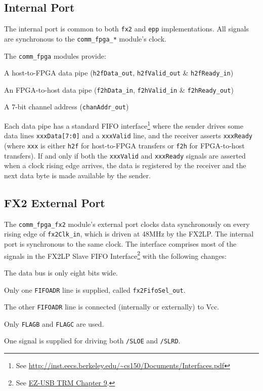 \subsection{Internal Port}
The internal port is common to both \texttt{fx2} and \texttt{epp} implementations. All signals are synchronous to the \texttt{comm\_fpga\_*} module's clock.


The \texttt{comm\_fpga} modules provide:

\begin{blobs}
  \item A host-to-FPGA data pipe (\texttt{h2fData\_out}, \texttt{h2fValid\_out} \& \texttt{h2fReady\_in})
  \item An FPGA-to-host data pipe (\texttt{f2hData\_in}, \texttt{f2hValid\_in} \& \texttt{f2hReady\_out})
  \item A 7-bit channel address (\texttt{chanAddr\_out})
\end{blobs}

Each data pipe has a standard FIFO interface\footnote{See \url{http://inst.eecs.berkeley.edu/~cs150/Documents/Interfaces.pdf}} where the sender drives some data lines \texttt{xxxData[7:0]} and a \texttt{xxxValid} line, and the receiver asserts \texttt{xxxReady} (where \texttt{xxx} is either \texttt{h2f} for host-to-FPGA transfers or \texttt{f2h} for FPGA-to-host transfers). If and only if both the \texttt{xxxValid} and \texttt{xxxReady} signals are asserted when a clock rising edge arrives, the data is registered by the receiver and the next data byte is made available by the sender.

\subsection{FX2 External Port}
The \texttt{comm\_fpga\_fx2} module's external port clocks data synchronously on every rising edge of \texttt{fx2Clk\_in}, which is driven at 48MHz by the FX2LP. The internal port is synchronous to the same clock. The interface comprises most of the signals in the FX2LP Slave FIFO Interface\footnote{See \href{http://www.cypress.com/?docID=27095}{EZ-USB TRM Chapter 9}.} with the following changes:

\begin{blobs}
  \item The data bus is only eight bits wide.
  \item Only one \texttt{FIFOADR} line is supplied, called \texttt{fx2FifoSel\_out}.
  \item The other \texttt{FIFOADR} line is connected (internally or externally) to Vcc.
  \item Only \texttt{FLAGB} and \texttt{FLAGC} are used.
  \item One signal is supplied for driving both \texttt{/SLOE} and \texttt{/SLRD}.
\end{blobs}

